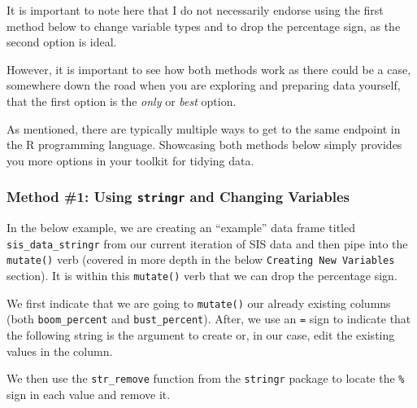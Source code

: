 \documentclass[
  letterpaper,
]{krantz}
\begin{document}
\begin{tcolorbox}[enhanced jigsaw, left=2mm, toprule=.15mm, opacitybacktitle=0.6, leftrule=.75mm, bottomrule=.15mm, colbacktitle=quarto-callout-note-color!10!white, breakable, colback=white, bottomtitle=1mm, toptitle=1mm, title=\textcolor{quarto-callout-note-color}{\faInfo}\hspace{0.5em}{Note}, coltitle=black, titlerule=0mm, arc=.35mm, opacityback=0, colframe=quarto-callout-note-color-frame, rightrule=.15mm]

It is important to note here that I do not necessarily endorse using the
first method below to change variable types and to drop the percentage
sign, as the second option is ideal.

However, it is important to see how both methods work as there could be
a case, somewhere down the road when you are exploring and preparing
data yourself, that the first option is the \emph{only} or \emph{best}
option.

As mentioned, there are typically multiple ways to get to the same
endpoint in the R programming language. Showcasing both methods below
simply provides you more options in your toolkit for tidying data.

\end{tcolorbox}

\hypertarget{method-1-using-stringr-and-changing-variables}{%
\subsubsection{\texorpdfstring{Method \#1: Using \texttt{stringr} and
Changing
Variables}{Method \#1: Using stringr and Changing Variables}}\label{method-1-using-stringr-and-changing-variables}}

In the below example, we are creating an ``example'' data frame titled
\texttt{sis\_data\_stringr} from our current iteration of SIS data and
then pipe into the \texttt{mutate()} verb (covered in more depth in the
below \texttt{Creating\ New\ Variables} section). It is within this
\texttt{mutate()} verb that we can drop the percentage sign.

We first indicate that we are going to \texttt{mutate()} our already
existing columns (both \texttt{boom\_percent} and
\texttt{bust\_percent}). After, we use an \texttt{=} sign to indicate
that the following string is the argument to create or, in our case,
edit the existing values in the column.

We then use the \texttt{str\_remove} function from the \texttt{stringr}
package to locate the \texttt{\%} sign in each value and remove it.
\end{document}
